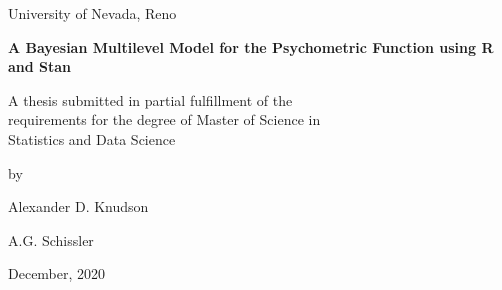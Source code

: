 \documentclass[11pt, oneside, openany]{scrbook}
\begin{document}
\begin{titlepage}
\begin{center}
\vspace*{1in}
University of Nevada, Reno

\vspace{1.5in}
\textbf{A Bayesian Multilevel Model for the Psychometric Function using R and Stan}

\vspace{1in}
A thesis submitted in partial fulfillment of the \\
requirements for the degree of Master of Science in \\
Statistics and Data Science

\vspace{1in}
by

\vspace{1em}
Alexander D. Knudson

\vspace{2em}
A.G. Schissler

\vspace{3em}
December, 2020

\end{center}
\end{titlepage}
\newpage
\thispagestyle{empty}
\end{document}

